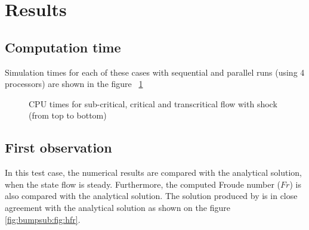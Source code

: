 \section{Results}

\subsection{Computation time}

Simulation times for each of these cases with sequential and parallel runs (using 4 processors) are shown in the figure ~\ref{fig:bump:cputime}

\begin{figure}[H]
  \centering
  \caption{CPU times for sub-critical, critical and transcritical flow with shock (from top to bottom)}\label{fig:bump:cputime}
\end{figure}


\subsection{First observation}

In this test case, the numerical results are compared with the
analytical solution, when the state flow is steady. Furthermore, the computed
Froude number ($Fr$) is also
compared with the analytical solution.
The solution produced by  is in close agreement with
the analytical solution as shown on the 
figure \ref{fig:bumpsub:fig:hfr}.


